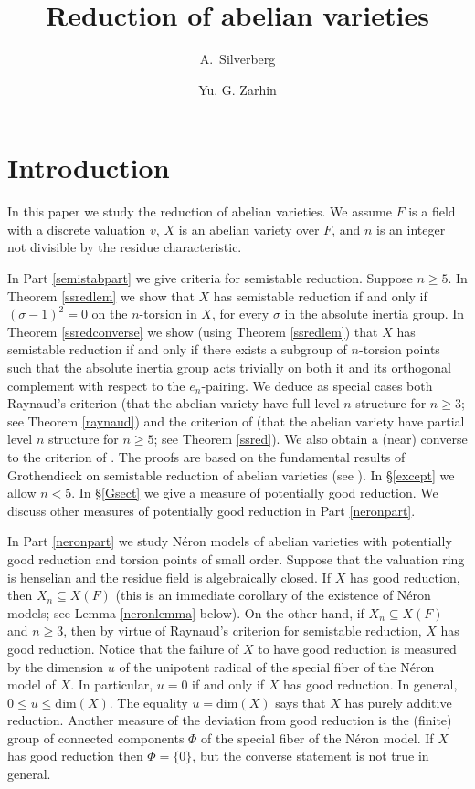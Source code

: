 \documentclass{amsart}
\title[Reduction of abelian varieties]
{Reduction of abelian varieties}
\author[A.\ Silverberg]{A.\ Silverberg}
\author[Yu. G. Zarhin]{Yu. G. Zarhin}
\def\dim{\mathrm{dim}}
\theoremstyle{definition}
\begin{document}
\maketitle

\section{Introduction}

In this paper we study the reduction of abelian varieties.
We assume $F$ is a field with a discrete valuation $v$, $X$ is an
abelian variety over $F$, and $n$ is an integer not divisible by
the residue characteristic.

In Part \ref{semistabpart} we give criteria for semistable reduction.
Suppose $n \ge 5$. In Theorem \ref{ssredlem} 
we show that $X$ has semistable reduction if and only if 
$(\sigma - 1)^2 = 0$ on the $n$-torsion in $X$, for every $\sigma$ in 
the absolute inertia group.
In Theorem \ref{ssredconverse} we show (using Theorem \ref{ssredlem}) 
that $X$ has semistable reduction 
if and only if there exists a subgroup of $n$-torsion points such that
the absolute inertia group acts trivially on both it and its orthogonal
complement with respect to the $e_n$-pairing.
We deduce as special cases both Raynaud's criterion (that the abelian 
variety have full level $n$ structure for $n \ge 3$; see 
Theorem \ref{raynaud}) and the criterion of \cite{semistab} (that the 
abelian variety have partial level $n$ structure for $n \ge 5$; see 
Theorem \ref{ssred}). We also obtain a (near) converse to the
criterion of \cite{semistab}. The proofs are based on the fundamental 
results of Grothendieck on semistable reduction of abelian varieties 
(see \cite{SGA}). In \S\ref{except} we allow $n<5$. In
\S\ref{Gsect} we give a measure of potentially good reduction.
We discuss other measures of potentially good reduction in 
Part  \ref{neronpart}.

In Part \ref{neronpart} we study N\'eron models of abelian 
varieties with potentially good reduction and torsion points of 
small order. Suppose that the valuation ring is henselian and 
the residue field is algebraically closed. 
If $X$ has good reduction, 
then $X_n \subseteq X(F)$ (this is an immediate corollary of the existence of 
N\'eron models; see Lemma \ref{neronlemma} below). 
On the other hand, if $X_n \subseteq X(F)$ and $n \ge 3$, 
then by virtue of Raynaud's criterion for semistable reduction, 
$X$ has good reduction.
Notice that the failure of $X$ to have good reduction is measured by 
the dimension $u$ of the unipotent radical of the special fiber of the N\'eron 
model of $X$. In particular, $u = 0$ if and only if $X$ has good reduction. 
In general, $0 \le u \le \dim(X)$. The equality $u = \dim(X)$
says that $X$ has purely additive reduction.
Another measure of the deviation from good reduction is the (finite) group of
connected components $\Phi$ of the special fiber of the N\'eron model. 
If $X$ has good reduction then $\Phi=\{0\}$, but the converse statement
is not true in general.
\end{document}

